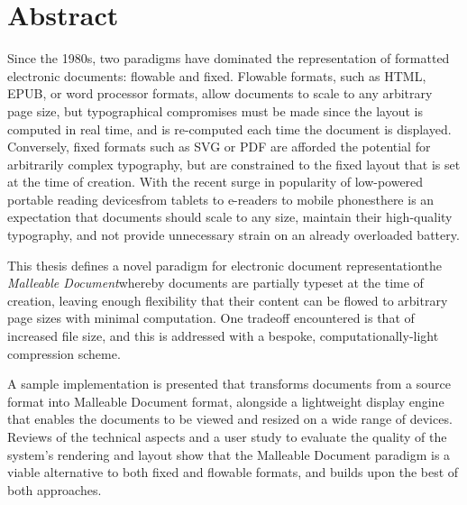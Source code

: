\cleardoublepage
\begingroup
\let\clearpage\relax
\let\cleardoublepage\relax
\let\cleardoublepage\relax

\chapter*{Abstract}

Since the 1980s, two paradigms have dominated the representation of formatted electronic documents: flowable and fixed. Flowable formats, such as HTML, EPUB, or word processor formats, allow documents to scale to any arbitrary page size, but typographical compromises must be made since the layout is computed in real time, and is re-computed each time the document is displayed. Conversely, fixed formats such as SVG or PDF are afforded the potential for arbitrarily complex typography, but are constrained to the fixed layout that is set at the time of creation. With the recent surge in popularity of low-powered portable reading devices\ed{}from tablets to e-readers to mobile phones\ed{}there is an expectation that documents should scale to any size, maintain their high-quality typography, and not provide unnecessary strain on an already overloaded battery.

This thesis defines a novel paradigm for electronic document representation\ed{}the \emph{Malleable Document}\ed{}whereby documents are partially typeset at the time of creation, leaving enough flexibility that their content can be flowed to arbitrary page sizes with minimal computation. One tradeoff encountered is that of increased file size, and this is addressed with a bespoke, computationally-light compression scheme.

A sample implementation is presented that transforms documents from a source format into Malleable Document format, alongside a lightweight display engine that enables the documents to be viewed and resized on a wide range of devices. Reviews of the technical aspects and a user study to evaluate the quality of the system's rendering and layout show that the Malleable Document paradigm is a viable alternative to both fixed and flowable formats, and builds upon the best of both approaches.


\endgroup

\vfill
